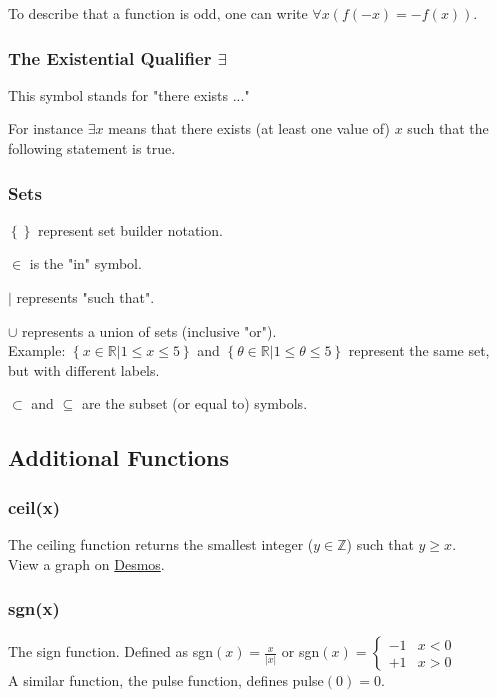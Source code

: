 \documentclass{article}
\begin{document}
To describe that a function is odd, one can write $\forall x \left(f\left(-x\right) = -f\left(x\right)\right)$.

\subsubsection{\texorpdfstring{The Existential Qualifier $\exists$}{The Existential Qualifier}}
This symbol stands for "there exists ..."

For instance $\exists x$ means that there exists (at least one value of) $x$ such that the following statement is true.

\subsubsection{Sets}
$\left\{\right\}$ represent set builder notation.

$\in$ is the "in" symbol.

$|$ represents "such that".

$\cup$ represents a union of sets (inclusive "or").\\
Example: $\left\{x \in \mathbb{R} | 1 \le x \le 5 \right\}$ and $\left\{\theta \in \mathbb{R} | 1 \le \theta \le 5 \right\}$ represent the same set, but with different labels.

$\subset$ and $\subseteq$ are the subset (or equal to) symbols.

\subsection{Additional Functions}
\subsubsection{ceil(x)}
The ceiling function returns the smallest integer ($y\in\mathbb{Z}$) such that $y \ge x$.\\
View a graph on \href{https://www.desmos.com/calculator/cpay9r9g5w}{Desmos}.

\subsubsection{sgn(x)}
The sign function. Defined as
sgn$(x) = \frac{x}{|x|}$ or sgn$(x) = \begin{cases}
    -1 &x<0\\
    +1 &x>0
\end{cases}$\\
A similar function, the pulse function, defines pulse$(0)=0$.
\end{document}
